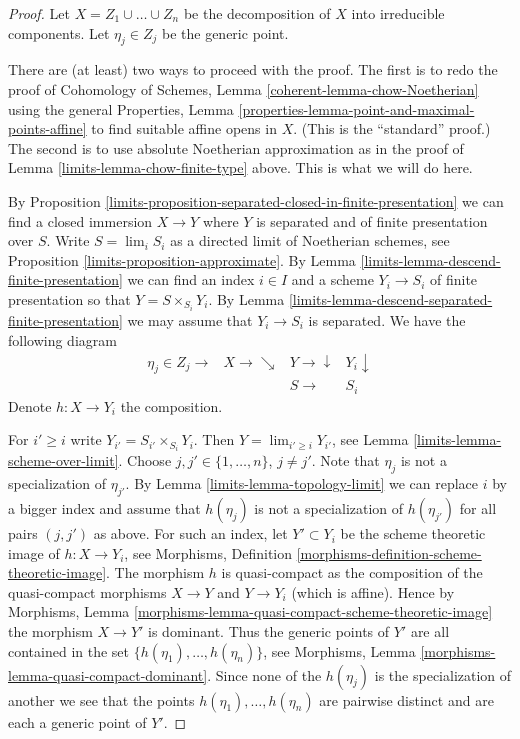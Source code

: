 \begin{proof}

Let $X = Z_1 \cup \ldots \cup Z_n$ be the decomposition of $X$
into irreducible components. Let $\eta_j \in Z_j$ be the generic point.

\medskip\noindent
There are (at least) two ways to proceed with the proof.
The first is to redo the proof of
Cohomology of Schemes, Lemma \ref{coherent-lemma-chow-Noetherian}
using the general
Properties, Lemma \ref{properties-lemma-point-and-maximal-points-affine}
to find suitable affine opens in $X$. (This is the ``standard'' proof.)
The second is to use absolute Noetherian approximation as in
the proof of Lemma \ref{limits-lemma-chow-finite-type} above.
This is what we will do here.

\medskip\noindent
By Proposition \ref{limits-proposition-separated-closed-in-finite-presentation}
we can find a closed immersion $X \to Y$ where $Y$ is separated
and of finite presentation over $S$.
Write $S = \lim_i S_i$ as a directed limit of Noetherian schemes, see
Proposition \ref{limits-proposition-approximate}. By
Lemma \ref{limits-lemma-descend-finite-presentation} we can
find an index $i \in I$ and a scheme $Y_i \to S_i$ of finite presentation
so that $Y = S \times_{S_i} Y_i$.
By Lemma \ref{limits-lemma-descend-separated-finite-presentation}
we may assume that $Y_i \to S_i$ is separated.
We have the following diagram
$$
\begin{array}{cccc}\eta_j \in Z_j \longrightarrow & X \longrightarrow\searrow & Y \longrightarrow\downarrow & Y_i \downarrow \\  &  & S \longrightarrow & S_i\end{array}
$$
Denote $h : X \to Y_i$ the composition.

\medskip\noindent
For $i' \geq i$ write $Y_{i'} = S_{i'} \times_{S_i} Y_i$.
Then $Y = \lim_{i' \geq i} Y_{i'}$, see
Lemma \ref{limits-lemma-scheme-over-limit}.
Choose $j, j' \in \{1, \ldots, n\}$, $j \not = j'$.
Note that $\eta_j$ is not a specialization of $\eta_{j'}$.
By Lemma \ref{limits-lemma-topology-limit}
we can replace $i$ by a bigger index and assume
that $h(\eta_j)$ is not a specialization of $h(\eta_{j'})$
for all pairs $(j, j')$ as above.
For such an index, let
$Y' \subset Y_i$ be the scheme theoretic image of
$h : X \to Y_i$, see
Morphisms, Definition \ref{morphisms-definition-scheme-theoretic-image}.
The morphism $h$ is quasi-compact as the composition of the quasi-compact
morphisms $X \to Y$ and $Y \to Y_i$ (which is affine).
Hence by
Morphisms, Lemma \ref{morphisms-lemma-quasi-compact-scheme-theoretic-image}
the morphism $X \to Y'$ is dominant. Thus the generic points
of $Y'$ are all contained in the set
$\{h(\eta_1), \ldots, h(\eta_n)\}$, see
Morphisms, Lemma \ref{morphisms-lemma-quasi-compact-dominant}.
Since none of the $h(\eta_j)$ is the specialization of another
we see that the points $h(\eta_1), \ldots, h(\eta_n)$ are pairwise
distinct and are each a generic point of $Y'$.


\end{proof}
